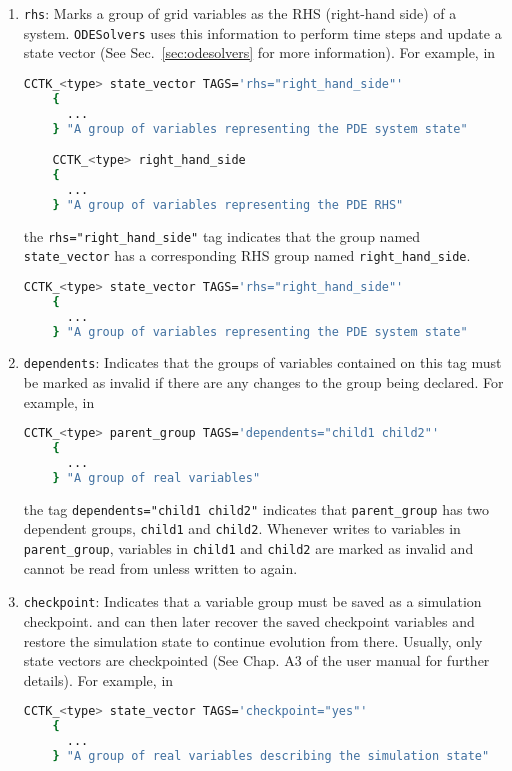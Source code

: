 \begin{enumerate}
  \item \texttt{rhs}: Marks a group of grid variables as the RHS (right-hand side) of a system. \texttt{ODESolvers} uses this information to perform time steps and update a state vector (See Sec.~\ref{sec:odesolvers} for more information). For example, in
  \begin{lstlisting}[language=bash]
    CCTK_<type> state_vector TAGS='rhs="right_hand_side"'
    {
      ...
    } "A group of variables representing the PDE system state"

    CCTK_<type> right_hand_side
    {
      ...
    } "A group of variables representing the PDE RHS"
  \end{lstlisting}
  the \texttt{rhs="right\_hand\_side"} tag indicates that the group named \texttt{state\_vector} has a corresponding RHS group named \texttt{right\_hand\_side}.

  \begin{lstlisting}[language=bash]
    CCTK_<type> state_vector TAGS='rhs="right_hand_side"'
    {
      ...
    } "A group of variables representing the PDE system state"
  \end{lstlisting}
  
  \item \texttt{dependents}: Indicates that the groups of variables contained on this tag must be marked as invalid if there are any changes to the group being declared. For example, in
  \begin{lstlisting}[language=bash]
    CCTK_<type> parent_group TAGS='dependents="child1 child2"'
    {
      ...
    } "A group of real variables"
  \end{lstlisting}
  the tag \texttt{dependents="child1 child2"} indicates that \texttt{parent\_group} has two dependent groups, \texttt{child1} and \texttt{child2}. Whenever \CarpetX\space writes to variables in \texttt{parent\_group}, variables in \texttt{child1} and \texttt{child2} are marked as invalid and cannot be read from unless written to again.
  
  \item \texttt{checkpoint}: Indicates that a variable group must be saved as a simulation checkpoint. \Cactus\space and \CarpetX\space can then later recover the saved checkpoint variables and restore the simulation state to continue evolution from there. Usually, only state vectors are checkpointed (See Chap. A3 of the \Cactus user manual for further details). For example, in
  \begin{lstlisting}[language=bash]
    CCTK_<type> state_vector TAGS='checkpoint="yes"'
    {
      ...
    } "A group of real variables describing the simulation state"


\end{lstlisting}
\end{enumerate}
